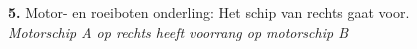 \vspace{-0.7cm}
\begin{figure}[H]
	\centering
	\begin{minipage}[t]{0.70\textwidth}
		\textbf{5.} Motor- en roeiboten onderling: Het schip van rechts gaat voor.\\
		\textit{Motorschip A op rechts heeft voorrang op motorschip B}
	\end{minipage}
	\hfill
	\begin{minipage}[t]{0.20\textwidth}
		\label{pic:kr5}
	\end{minipage}
	\hfill
\end{figure}

\vspace{-0.7cm}


